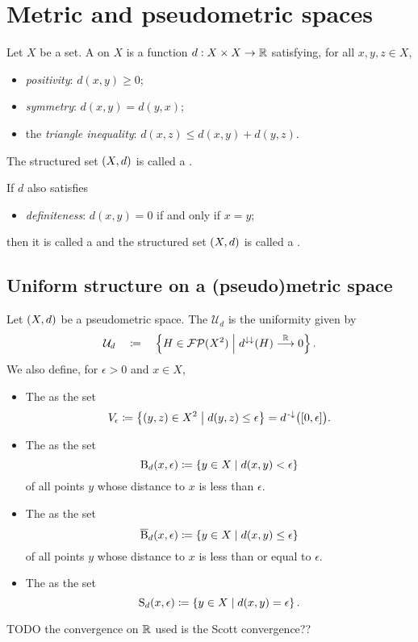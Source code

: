 \section{Metric and pseudometric spaces}
\begin{definition}
Let $X$ be a set. A  on $X$ is a function $d: X\times X\to \mathbb{R}$ satisfying, for all $x,y,z\in X$,
\begin{itemize}
\item \emph{positivity}: $d(x,y) \geq 0$;
\item \emph{symmetry}: $d(x,y) = d(y,x)$;
\item the \emph{triangle inequality}: $d(x,z) \leq d(x,y) + d(y,z)$.
\end{itemize}
The structured set $\left( X,d \right)$ is called a .

If $d$ also satisfies
\begin{itemize}
\item \emph{definiteness}: $d(x,y) = 0$ \textup{if and only if} $x=y$;
\end{itemize}
then it is called a  and the structured set $\left( X,d \right)$ is called a .
\end{definition}

\subsection{Uniform structure on a (pseudo)metric space}
\begin{definition}
Let $\left( X,d \right)$ be a pseudometric space. The  $\mathcal{U}_d$ is the uniformity given by
\[ \mathcal{U}_d \quad\coloneqq\quad \left\{ H\in \operatorname{\mathcal{FP}}(X^2) \;\middle|\; d^{\downarrow\downarrow}(H) \overset{\mathbb{R}}{\longrightarrow} 0 \right\}.  \]
We also define, for $\epsilon >0$ and $x\in X$,
\begin{itemize}
\item The  as the set
\[ V_\epsilon \defeq \setbuilder{(y,z)\in X^2}{d(y,z)\leq \epsilon} = d^{\preimf}\big(\interval{0,\epsilon}\big). \]
\item The  as the set
\[ \operatorname{B}_d(x,\epsilon) \coloneqq \left\{ y\in X \;\middle|\; d(x,y)< \epsilon \right\} \]
of all points $y$ whose distance to $x$ is less than $\epsilon$.
\item The  as the set
\[ \operatorname{\overline{B}}_d(x,\epsilon) \coloneqq \left\{ y\in X \;\middle|\; d(x,y)\leq \epsilon \right\} \]
of all points $y$ whose distance to $x$ is less than or equal to $\epsilon$.
\item The  as the set
\[ \operatorname{S}_d(x,\epsilon) \coloneqq \left\{ y\in X \;\middle|\; d(x,y) = \epsilon \right\}. \]
\end{itemize}
\end{definition}
TODO the convergence on $\mathbb{R}$ used is the Scott convergence??

